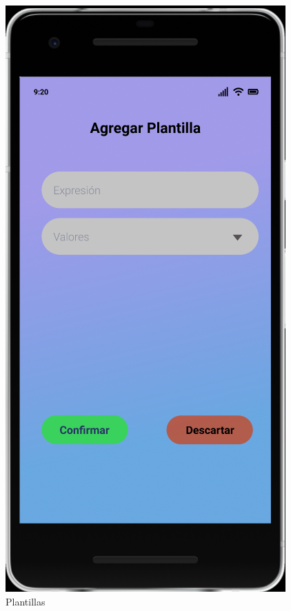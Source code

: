 \documentclass{article}
\begin{document}
\begin{figure}[H]
    \centering
    \includegraphics[scale=0.9]{imgs/Figma/Plantilla}
    \caption{Plantillas}
\end{figure}
\end{document}
